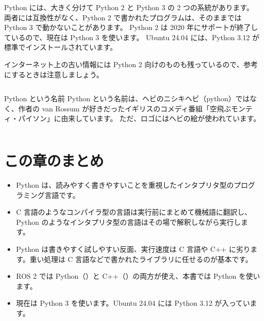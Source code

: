 Python には、大きく分けて Python 2 と Python 3 の 2 つの系統があります。
両者には互換性がなく、Python 2 で書かれたプログラムは、そのままでは Python 3 で動かないことがあります。
Python 2 は 2020 年にサポートが終了しているので、現在は Python 3 を使います。
Ubuntu 24.04 には、Python 3.12 が標準でインストールされています。


インターネット上の古い情報には Python 2 向けのものも残っているので、参考にするときは注意しましょう。

\begin{column}{Python という名前}
  Python という名前は、ヘビのニシキヘビ（python）ではなく、作者の van Rossum が好きだったイギリスのコメディ番組「空飛ぶモンティ・パイソン」に由来しています。
  ただ、ロゴにはヘビの絵が使われています。
\end{column}

\section*{この章のまとめ}

\begin{itemize}
  \item Python は、読みやすく書きやすいことを重視したインタプリタ型のプログラミング言語です。
  \item C 言語のようなコンパイラ型の言語は実行前にまとめて機械語に翻訳し、Python のようなインタプリタ型の言語はその場で解釈しながら実行します。
  \item Python は書きやすく試しやすい反面、実行速度は C 言語や C++ に劣ります。重い処理は C 言語などで書かれたライブラリに任せるのが基本です。
  \item ROS 2 では Python（）と C++（）の両方が使え、本書では Python を使います。
  \item 現在は Python 3 を使います。Ubuntu 24.04 には Python 3.12 が入っています。
\end{itemize}

